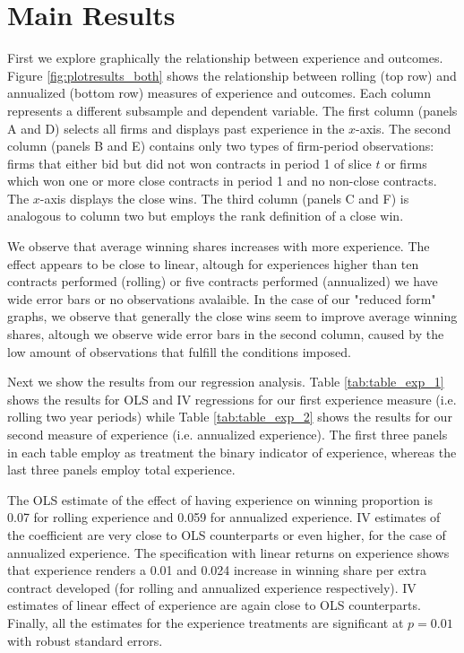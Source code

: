 \section{Main Results}

First we explore graphically the relationship between experience and outcomes. Figure \ref{fig:plotresults_both} shows the relationship between rolling (top row) and annualized (bottom row) measures of experience and outcomes.  Each column represents a different subsample and dependent variable. The first column (panels A and D) selects all firms and displays past experience in the $x$-axis. The second column (panels B and E) contains only two types of firm-period observations: firms that either bid but did not won contracts in period 1 of slice $t$ or firms which won one or more close contracts in period 1 and no non-close contracts. The $x$-axis displays the close wins. The third column (panels C and F) is analogous to column two but employs the rank definition of a close win.

We observe that average winning shares increases with more experience. The effect appears to be close to linear, altough for experiences higher than ten contracts performed (rolling) or five contracts performed (annualized) we have wide error bars or no observations avalaible. In the case of our "reduced form" graphs, we observe that generally the close wins seem to improve average winning shares, altough we observe wide error bars in the second column, caused by the low amount of observations that fulfill the conditions imposed.

Next we show the results from our regression analysis. Table \ref{tab:table_exp_1} shows the results for OLS and IV regressions for our first experience measure (i.e. rolling two year periods) while Table \ref{tab:table_exp_2} shows the results for our second measure of experience (i.e. annualized experience). The first three panels in each table employ as treatment the binary indicator of experience, whereas the last three panels employ total experience.

The OLS estimate of the effect of having experience on winning proportion is 0.07 for rolling experience and 0.059 for annualized experience. IV estimates of the coefficient are very close to OLS counterparts or even higher, for the case of annualized experience. The specification with linear returns on experience shows that experience renders a 0.01 and 0.024 increase in winning share per extra contract developed (for rolling and annualized experience respectively). IV estimates of linear effect of experience are again close to OLS counterparts. Finally, all the estimates for the experience treatments are significant at $p=0.01$ with robust standard errors.

